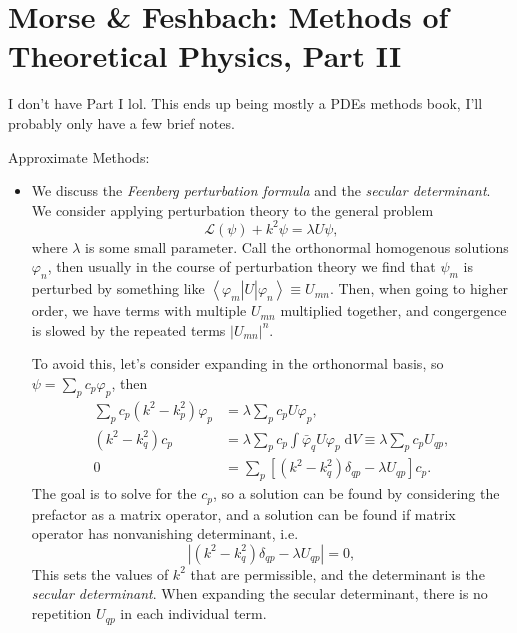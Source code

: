 \documentclass[11pt,
        usenames, %
        dvipsnames %
    ]{report}
\newcommand*{\bra}[1]{\left<#1\right|}
\newcommand*{\ket}[1]{\left|#1\right>}
\newcommand*{\abs}[1]{\left|#1\right|}
\newcommand*{\p}[1]{\left(#1\right)}
\newcommand*{\s}[1]{\left[#1\right]}
\begin{document}
\chapter{Morse \& Feshbach: Methods of Theoretical Physics, Part II}

I don't have Part I lol. This ends up being mostly a PDEs methods book, I'll
probably only have a few brief notes.

Approximate Methods:
\begin{itemize}
    \item We discuss the \emph{Feenberg perturbation formula} and the
        \emph{secular determinant}. We consider applying perturbation theory to
        the general problem
        \begin{equation}
            \mathcal{L}(\psi) + k^2\psi = \lambda U \psi,
        \end{equation}
        where $\lambda$ is some small parameter. Call the orthonormal homogenous
        solutions $\varphi_n$, then usually in the course of perturbation theory
        we find that $\psi_m$ is perturbed by something like
        $\bra{\varphi_m}U\ket{\varphi_n} \equiv U_{mn}$. Then, when going to
        higher order, we have terms with multiple $U_{mn}$ multiplied together,
        and congergence is slowed by the repeated terms $\abs{U_{mn}}^n$.

        To avoid this, let's consider expanding in the orthonormal basis, so
        $\psi = \sum\limits_p c_p\varphi_p$, then
        \begin{align}
            \sum\limits_p c_p\p{k^2 - k_p^2}\varphi_p &= \lambda \sum\limits_p
                c_p U\varphi_p,\\
            \p{k^2 - k_q^2}c_p &= \lambda \sum\limits_p c_p
                \int\limits \bar{\varphi}_q U \varphi_p\;\mathrm{d}V
                \equiv \lambda \sum\limits_p c_p U_{qp},\\
                0 &= \sum\limits_p\s{\p{k^2 - k_q^2}\delta_{qp}
                    - \lambda U_{qp}}c_p.
        \end{align}
        The goal is to solve for the $c_p$, so a solution can be found by
        considering the prefactor as a matrix operator, and a solution can be
        found if matrix operator has nonvanishing determinant, i.e.
        \begin{equation}
            \abs{\p{k^2 - k_q^2}\delta_{qp} - \lambda U_{qp}} = 0,
        \end{equation}
        This sets the values of $k^2$ that are permissible, and the determinant
        is the \emph{secular determinant}. When expanding the secular
        determinant, there is no repetition $U_{qp}$ in each individual term.


\end{itemize}
\end{document}

